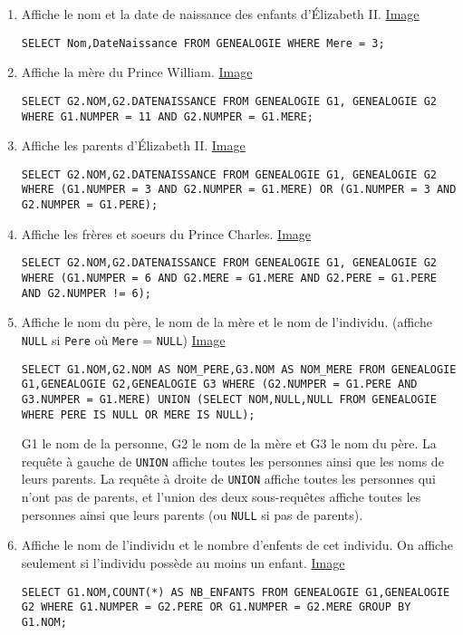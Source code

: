 \documentclass{report}
\begin{document}
\begin{enumerate}
	\item Affiche le nom et la date de naissance des enfants d'Élizabeth II. \href{run:./Images/TP5/gen1.png}{Image}
	\begin{lstlisting}
SELECT Nom,DateNaissance FROM GENEALOGIE WHERE Mere = 3;
	\end{lstlisting}
	\item Affiche la mère du Prince William. \href{run:./Images/TP5/gen2.png}{Image}
	\begin{lstlisting}
SELECT G2.NOM,G2.DATENAISSANCE FROM GENEALOGIE G1, GENEALOGIE G2 WHERE G1.NUMPER = 11 AND G2.NUMPER = G1.MERE;
	\end{lstlisting}
	\item Affiche les parents d'Élizabeth II. \href{run:./Images/TP5/gen3.png}{Image}
	\begin{lstlisting}
SELECT G2.NOM,G2.DATENAISSANCE FROM GENEALOGIE G1, GENEALOGIE G2 WHERE (G1.NUMPER = 3 AND G2.NUMPER = G1.MERE) OR (G1.NUMPER = 3 AND G2.NUMPER = G1.PERE);
	\end{lstlisting}
	\item Affiche les frères et soeurs du Prince Charles. \href{run:./Images/TP5/gen4.png}{Image}
	\begin{lstlisting}
SELECT G2.NOM,G2.DATENAISSANCE FROM GENEALOGIE G1, GENEALOGIE G2 WHERE (G1.NUMPER = 6 AND G2.MERE = G1.MERE AND G2.PERE = G1.PERE AND G2.NUMPER != 6);
	\end{lstlisting}
	\item Affiche le nom du père, le nom de la mère et le nom de l'individu. (affiche {\tt NULL} si {\tt Pere} où {\tt Mere} = {\tt NULL}) \href{run:./Images/TP5/gen5.png}{Image}
	\begin{lstlisting}
SELECT G1.NOM,G2.NOM AS NOM_PERE,G3.NOM AS NOM_MERE FROM GENEALOGIE G1,GENEALOGIE G2,GENEALOGIE G3 WHERE (G2.NUMPER = G1.PERE AND G3.NUMPER = G1.MERE) UNION (SELECT NOM,NULL,NULL FROM GENEALOGIE WHERE PERE IS NULL OR MERE IS NULL);
	\end{lstlisting}
	G1 le nom de la personne, G2 le nom de la mère et G3 le nom du père. La requête à gauche de {\tt UNION} affiche toutes les personnes ainsi que les noms de leurs parents. La requête à droite de {\tt UNION} affiche toutes les personnes qui n'ont pas de parents, et l'union des deux sous-requêtes affiche toutes les personnes ainsi que leurs parents (ou {\tt NULL} si pas de parents).
	\item Affiche le nom de  l'individu et le nombre d'enfents de cet individu. On affiche seulement si l'individu possède au moins un enfant. \href{run:./Images/TP5/gen6.png}{Image}
	\begin{lstlisting}
SELECT G1.NOM,COUNT(*) AS NB_ENFANTS FROM GENEALOGIE G1,GENEALOGIE G2 WHERE G1.NUMPER = G2.PERE OR G1.NUMPER = G2.MERE GROUP BY G1.NOM;
	\end{lstlisting}
\end{enumerate}
\end{document}
